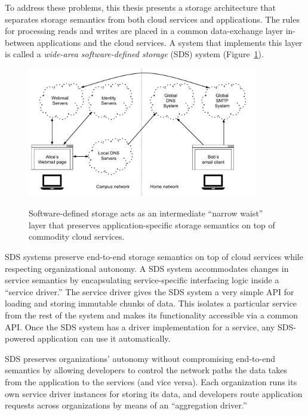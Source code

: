 
To address these problems, this thesis presents a 
storage architecture that separates storage semantics
from both cloud services and applications.  The rules for processing reads and writes
are placed in a common data-exchange
layer in-between applications and the cloud services.  A system that
implements this layer is called a \emph{wide-area software-defined storage} (SDS) system
(Figure~\ref{fig:chap1-sds-overview}).

\begin{figure}[h]
   \caption{Software-defined storage acts as an intermediate ``narrow waist''
   layer that preserves application-specific storage semantics on top of
   commodity cloud services.}
   \centering
   \includegraphics[width=0.9\textwidth,page=28]{figures/dissertation-figures}
   \label{fig:chap1-sds-overview}
\end{figure}

SDS systems preserve end-to-end storage semantics on top of cloud services while respecting
organizational autonomy.  A SDS system accommodates changes in service semantics
by encapsulating service-specific interfacing logic inside a ``service driver.''
The service driver gives the SDS system a very simple API for loading and
storing immutable chunks of data.  This isolates a particular service from the rest of the
system and makes its functionality accessible via a common API.  Once the SDS system has a
driver implementation for a service, any SDS-powered application can use it
automatically.

SDS preserves organizations' autonomy without compromising end-to-end semantics by
allowing developers to control the network paths the data takes from the application to
the services (and vice versa).  Each organization runs its own
service driver instances for storing its data, and developers
route application requests across organizations by means of an ``aggregation driver.''


